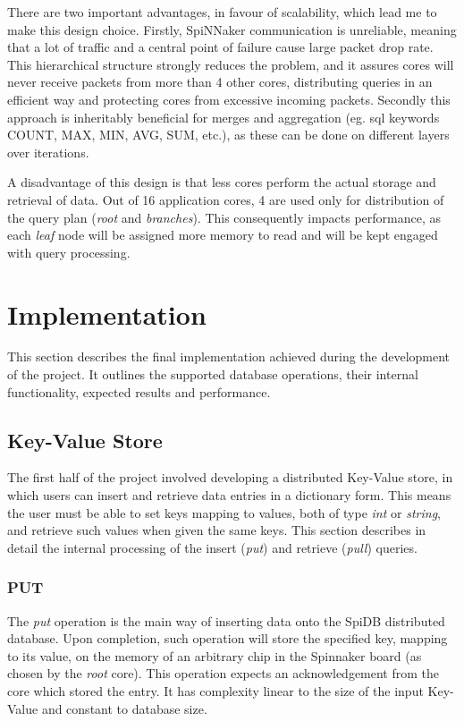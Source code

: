 There are two important advantages, in favour of scalability, which lead me to make this design choice. Firstly, SpiNNaker communication is unreliable, meaning that a lot of traffic and a central point of failure cause large packet drop rate. This hierarchical structure strongly reduces the problem, and it assures cores will never receive packets from more than 4 other cores, distributing queries in an efficient way and protecting cores from excessive incoming packets. Secondly this approach is inheritably beneficial for merges and aggregation (eg. sql keywords COUNT, MAX, MIN, AVG, SUM, etc.), as these can be done on different layers over iterations. 

A disadvantage of this design is that less cores perform the actual storage and retrieval of data. Out of 16 application cores, 4 are used only for distribution of the query plan (\textit{root} and \textit{branches}). This consequently impacts performance, as each \textit{leaf} node will be assigned more memory to read and will be kept engaged with query processing.

\section{Implementation}
\label{sec:implementation}
This section describes the final implementation achieved during the development of the project. It outlines the supported database operations, their internal functionality, expected results and performance.

\subsection{Key-Value Store}
The first half of the project involved developing a distributed Key-Value store, in which users can insert and retrieve data entries in a dictionary form. This means the user must be able to set keys mapping to values, both of type \textit{int} or \textit{string}, and retrieve such values when given the same keys. This section describes in detail the internal processing of the insert (\textit{put}) and retrieve (\textit{pull}) queries. 

\subsubsection{PUT}
The \textit{put} operation is the main way of inserting data onto the SpiDB distributed database. 
Upon completion, such operation will store the specified key, mapping to its value, on the memory of an arbitrary chip in the Spinnaker board (as chosen by the \textit{root} core). This operation expects an acknowledgement from the core which stored the entry. It has complexity linear to the size of the input Key-Value and constant to database size.

